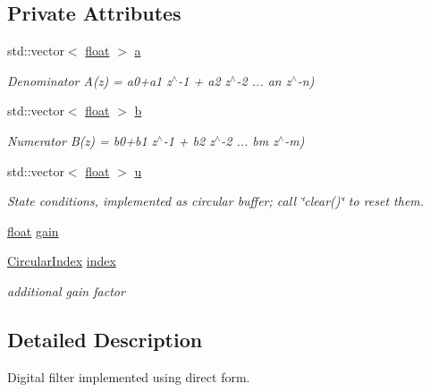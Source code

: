 \subsection*{Private Attributes}
\begin{DoxyCompactItemize}
\item 
std\+::vector$<$ \hyperlink{FFTReal__readme_8txt_a0ea2fae2a8106200bf378b90eae003cf}{float} $>$ \hyperlink{classupc_1_1DigitalFilter_a2452cdde3d6845b838d9ebed8099dc4e}{a}
\begin{DoxyCompactList}\small\item\em Denominator A(z) = a0+a1 z$^\wedge$-\/1 + a2 z$^\wedge$-\/2 ... an z$^\wedge$-\/n) \end{DoxyCompactList}\item 
std\+::vector$<$ \hyperlink{FFTReal__readme_8txt_a0ea2fae2a8106200bf378b90eae003cf}{float} $>$ \hyperlink{classupc_1_1DigitalFilter_ad72194d793b429b0f0eea9fab017da68}{b}
\begin{DoxyCompactList}\small\item\em Numerator B(z) = b0+b1 z$^\wedge$-\/1 + b2 z$^\wedge$-\/2 ... bm z$^\wedge$-\/m) \end{DoxyCompactList}\item 
std\+::vector$<$ \hyperlink{FFTReal__readme_8txt_a0ea2fae2a8106200bf378b90eae003cf}{float} $>$ \hyperlink{classupc_1_1DigitalFilter_ad8b8d1c7bde2fca050aa297b66d69179}{u}
\begin{DoxyCompactList}\small\item\em State conditions, implemented as circular buffer; call \char`\"{}clear()\char`\"{} to reset them. \end{DoxyCompactList}\item 
\hyperlink{FFTReal__readme_8txt_a0ea2fae2a8106200bf378b90eae003cf}{float} \hyperlink{classupc_1_1DigitalFilter_aaa94a0d08f87c98612d9471719bd773a}{gain}
\item 
\hyperlink{classupc_1_1CircularIndex}{Circular\+Index} \hyperlink{classupc_1_1DigitalFilter_ae2b58018045cfca38cad387dd4b82e83}{index}
\begin{DoxyCompactList}\small\item\em additional gain factor \end{DoxyCompactList}\end{DoxyCompactItemize}


\subsection{Detailed Description}
Digital filter implemented using direct form. 

